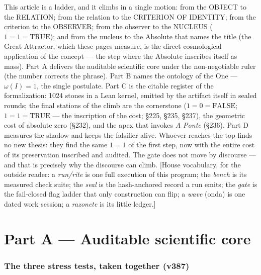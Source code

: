 \documentclass[11pt]{article}
\theoremstyle{definition}\newtheorem{deriv}{Derivation}
\begin{document}
\noindent This article is a ladder, and it climbs in a single motion: from the OBJECT to the RELATION; from the relation to the CRITERION OF IDENTITY; from the criterion to the OBSERVER; from the observer to the NUCLEUS ($1{=}1{=}\mathrm{TRUE}$); and from the nucleus to the Absolute that names the title (the Great Attractor, which these pages measure, is the direct cosmological application of the concept --- the step where the Absolute inscribes itself as mass). Part A delivers the auditable scientific core under the non-negotiable ruler (the number corrects the phrase). Part B names the ontology of the One --- $\omega(I){=}1$, the single postulate. Part C is the citable register of the formalization: 1024 stones in a Lean kernel, emitted by the artifact itself in sealed rounds; the final stations of the climb are the cornerstone ($1{=}0{=}\mathrm{FALSE}$; $1{=}1{=}\mathrm{TRUE}$ --- the inscription of the cost; \S225, \S235, \S237), the geometric cost of absolute zero (\S232), and the apex that invokes \emph{A Ponte} (\S236). Part D measures the shadow and keeps the falsifier alive. Whoever reaches the top finds no new thesis: they find the same $1{=}1$ of the first step, now with the entire cost of its preservation inscribed and audited. The gate does not move by discourse --- and that is precisely why the discourse can climb. [House vocabulary, for the outside reader: a \emph{run/rite} is one full execution of this program; the \emph{bench} is its measured check suite; the \emph{seal} is the hash-anchored record a run emits; the \emph{gate} is the fail-closed flag ladder that only construction can flip; a \emph{wave} (onda) is one dated work session; a \emph{razonete} is its little ledger.]

\part{Part A --- Auditable scientific core}

\section*{The three stress tests, taken together (v387)}

\end{document}
